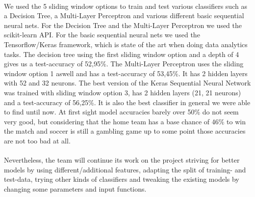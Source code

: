\\
We used the 5 sliding window options to train and test various classifiers such as a Decision Tree, a Multi-Layer Perceptron and various different basic sequential neural nets. For the Decision Tree and the Multi-Layer Perceptron we used the scikit-learn API. For the basic sequential neural nets we used the Tensorflow/Keras framework, which is state of the art when doing data analytics tasks.\newline
The decision tree using the first sliding window option and a depth of 4 gives us a test-accuracy of 52,95\%. The Multi-Layer Perceptron uses the sliding window option 1 aswell and has a test-accuracy of 53,45\%. It has 2 hidden layers with 52 and 32 neurons. The best version of the Keras Sequential Neural Network was trained with sliding window option 3, has 2 hidden layers (21, 21 neurons) and a test-accuracy of 56,25\%. It is also the best classifier in general we were able to find until now. At first sight model accuracies barely over 50\% do not seem very good, but considering that the home team has a base chance of 46\% to win the match and soccer is still a gambling game up to some point those accuracies are not too bad at all.\\
\\
Nevertheless, the team will continue its work on the project striving for better models by using different/additional features, adapting the split of training- and test-data, trying other kinds of classifiers and tweaking the existing models by changing some parameters and input functions.